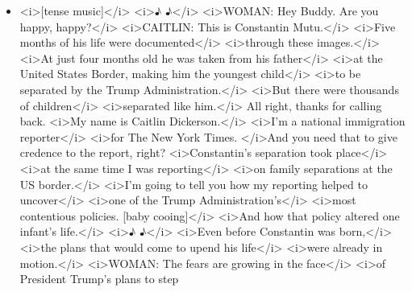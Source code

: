 \begin{itemize}
\tightlist
\item
  \textless{}i\textgreater{}{[}tense music{]}\textless{}/i\textgreater{}
  \textless{}i\textgreater{}♪ ♪\textless{}/i\textgreater{}
  \textless{}i\textgreater{}WOMAN: Hey Buddy. Are you happy,
  happy?\textless{}/i\textgreater{} \textless{}i\textgreater{}CAITLIN:
  This is Constantin Mutu.\textless{}/i\textgreater{}
  \textless{}i\textgreater{}Five months of his life were
  documented\textless{}/i\textgreater{}
  \textless{}i\textgreater{}through these
  images.\textless{}/i\textgreater{} \textless{}i\textgreater{}At just
  four months old he was taken from his
  father\textless{}/i\textgreater{} \textless{}i\textgreater{}at the
  United States Border, making him the youngest
  child\textless{}/i\textgreater{} \textless{}i\textgreater{}to be
  separated by the Trump Administration.\textless{}/i\textgreater{}
  \textless{}i\textgreater{}But there were thousands of
  children\textless{}/i\textgreater{}
  \textless{}i\textgreater{}separated like
  him.\textless{}/i\textgreater{} All right, thanks for calling back.
  \textless{}i\textgreater{}My name is Caitlin
  Dickerson.\textless{}/i\textgreater{} \textless{}i\textgreater{}I'm a
  national immigration reporter\textless{}/i\textgreater{}
  \textless{}i\textgreater{}for The New York Times.
  \textless{}/i\textgreater{}And you need that to give credence to the
  report, right? \textless{}i\textgreater{}Constantin's separation took
  place\textless{}/i\textgreater{} \textless{}i\textgreater{}at the same
  time I was reporting\textless{}/i\textgreater{}
  \textless{}i\textgreater{}on family separations at the US
  border.\textless{}/i\textgreater{} \textless{}i\textgreater{}I'm going
  to tell you how my reporting helped to
  uncover\textless{}/i\textgreater{} \textless{}i\textgreater{}one of
  the Trump Administration's\textless{}/i\textgreater{}
  \textless{}i\textgreater{}most contentious policies. {[}baby
  cooing{]}\textless{}/i\textgreater{} \textless{}i\textgreater{}And how
  that policy altered one infant's life.\textless{}/i\textgreater{}
  \textless{}i\textgreater{}♪ ♪\textless{}/i\textgreater{}
  \textless{}i\textgreater{}Even before Constantin was
  born,\textless{}/i\textgreater{} \textless{}i\textgreater{}the plans
  that would come to upend his life\textless{}/i\textgreater{}
  \textless{}i\textgreater{}were already in
  motion.\textless{}/i\textgreater{} \textless{}i\textgreater{}WOMAN:
  The fears are growing in the face\textless{}/i\textgreater{}
  \textless{}i\textgreater{}of President Trump's plans to step

\end{itemize}
